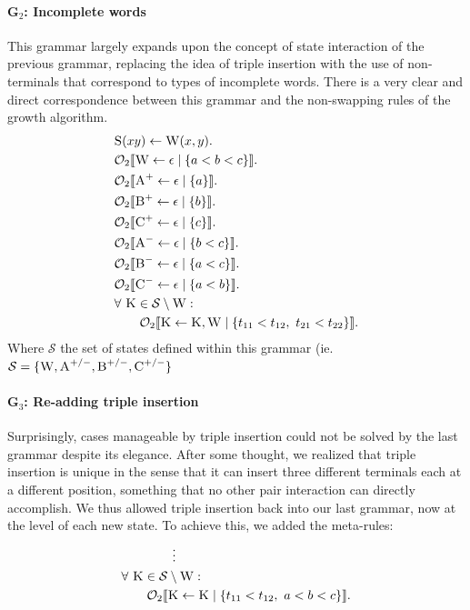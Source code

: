 \documentclass[nonatbib,numbers,10pt]{sigplanconf}
\newcommand\s{\textsc}
\newcommand{\Orderr}[5]{
	\mathcal{#1}_{#5}\llbracket #2 \leftarrow #3 \mid \{ #4 \} \rrbracket.
}
\newcommand{\Or}[4]{\Orderr{O}{#1}{#2}{#3}{#4}}
\begin{document}
\paragraph{G$_2$: Incomplete words}
This grammar largely expands upon the concept of state interaction of the previous grammar, replacing the idea of triple insertion with the use of non-terminals that correspond to types of incomplete words. There is a very clear and direct correspondence between this grammar and the non-swapping rules of the growth algorithm.
\begin{align*}
&\s{S}(xy) \leftarrow \s{W}(x,y). \\
&\Or{\s{W}}{\epsilon}{a < b < c}{2} \\
&\Or{\s{A}^+}{\epsilon}{a}{2} \\
&\Or{\s{B}^+}{\epsilon}{b}{2} \\
&\Or{\s{C}^+}{\epsilon}{c}{2} \\
&\Or{\s{A}^-}{\epsilon}{b < c}{2} \\
&\Or{\s{B}^-}{\epsilon}{a < c}{2} \\
&\Or{\s{C}^-}{\epsilon}{a < b}{2} \\
&\forall \ \s{K} \in \mathcal{S} \setminus \s{W}:\\ 
&\quad\quad\Or{\s{K}}{\s{K}, \s{W}}{t_{11} < t_{12},\ t_{21} < t_{22}}{2}
\end{align*}
Where $\mathcal{S}$ the set of states defined within this grammar (ie. $\mathcal{S}= \{\textsc{W}, \textsc{A}^{+/-}, \textsc{B}^{+/-}, \textsc{C}^{+/-}\}$
\paragraph{G$_3$: Re-adding triple insertion}
Surprisingly, cases manageable by triple insertion could not be solved by the last grammar despite its elegance. After some thought, we realized that triple insertion is unique in the sense that it can insert three different terminals each at a different position, something that no other pair interaction can directly accomplish. We thus allowed triple insertion back into our last grammar, now at the level of each new state. To achieve this, we added the meta-rules:
\begin{align*}
& \quad\quad\quad\quad \vdots \\
&\forall \ \s{K} \in \mathcal{S} \setminus \s{W}:\\ 
&\quad\quad\Or{\s{K}}{\s{K}}{t_{11} < t_{12},\ a < b < c}{2}
\end{align*}
\end{document}
